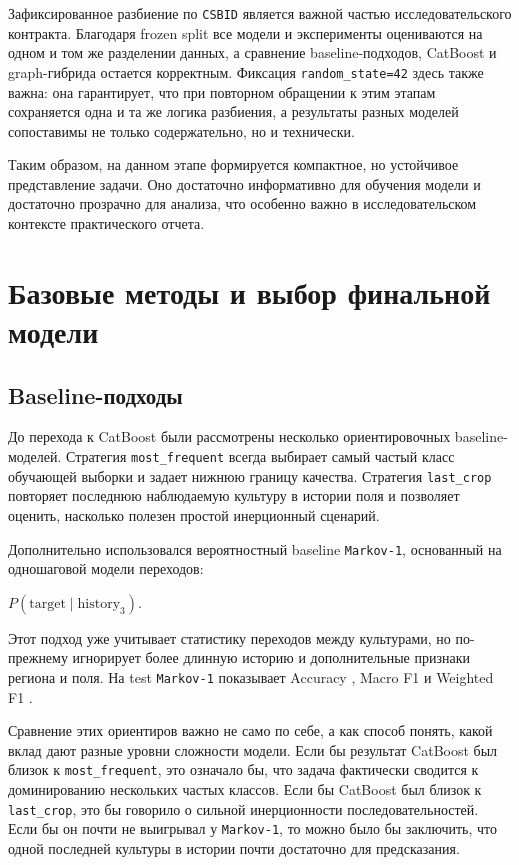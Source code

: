 

Зафиксированное разбиение по \texttt{CSBID} является важной частью исследовательского контракта. Благодаря frozen split все модели и эксперименты оцениваются на одном и том же разделении данных, а сравнение baseline-подходов, CatBoost и graph-гибрида остается корректным. Фиксация \texttt{random\_state=42} здесь также важна: она гарантирует, что при повторном обращении к этим этапам сохраняется одна и та же логика разбиения, а результаты разных моделей сопоставимы не только содержательно, но и технически.

Таким образом, на данном этапе формируется компактное, но устойчивое представление задачи. Оно достаточно информативно для обучения модели и достаточно прозрачно для анализа, что особенно важно в исследовательском контексте практического отчета.

\section{Базовые методы и выбор финальной модели}

\subsection{Baseline-подходы}

До перехода к CatBoost были рассмотрены несколько ориентировочных baseline-моделей. Стратегия \texttt{most\_frequent} всегда выбирает самый частый класс обучающей выборки и задает нижнюю границу качества. Стратегия \texttt{last\_crop} повторяет последнюю наблюдаемую культуру в истории поля и позволяет оценить, насколько полезен простой инерционный сценарий.

Дополнительно использовался вероятностный baseline \texttt{Markov-1}, основанный на одношаговой модели переходов:
\begin{center}
\(
P(\mathrm{target}\mid\mathrm{history}_3).
\)
\end{center}

Этот подход уже учитывает статистику переходов между культурами, но по-прежнему игнорирует более длинную историю и дополнительные признаки региона и поля. На test \texttt{Markov-1} показывает Accuracy \MarkovAcc{}, Macro F1 \MarkovMacroFOne{} и Weighted F1 \MarkovWeightedFOne{}.

Сравнение этих ориентиров важно не само по себе, а как способ понять, какой вклад дают разные уровни сложности модели. Если бы результат CatBoost был близок к \texttt{most\_frequent}, это означало бы, что задача фактически сводится к доминированию нескольких частых классов. Если бы CatBoost был близок к \texttt{last\_crop}, это бы говорило о сильной инерционности последовательностей. Если бы он почти не выигрывал у \texttt{Markov-1}, то можно было бы заключить, что одной последней культуры в истории почти достаточно для предсказания.

